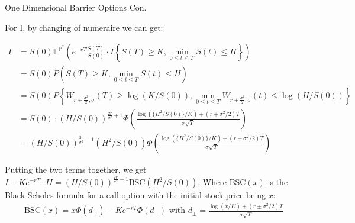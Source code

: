 \documentclass{beamer}
\begin{document}
\begin{frame}{One Dimensional Barrier Options Con.}
    
    {\footnotesize \footnotesize
    \par For I, by changing of numeraire we can get:\pause
    \vspace{-0.5em}
    {\footnotesize \scriptsize
    \begin{align*}
    I &= S(0) \mathbb{E}^{\mathbb{P}^*} \left( e^{-rT} \frac{S(T)}{S(0)} \cdot I\left\{S(T) \geq K, \min_{0 \leq t \leq T} S(t) \leq H\right\} \right) \\
    &= S(0) \tilde{P}\left(S(T) \geq K, \min_{0 \leq t \leq T} S(t) \leq H\right) \\
    &= S(0) P\left\{W_{r+\frac{\sigma^2}{2}, \sigma}(T) \geq \log(K/S(0)), \min_{0 \leq t \leq T} W_{r+\frac{\sigma^2}{2}, \sigma}(t) \leq \log(H/S(0))\right\} \\
    &= S(0) \cdot (H/S(0))^{\frac{2r}{\sigma^2}+1} \Phi \left( \frac{\log(\{H^2/S(0)\}/K)+(r+\sigma^2/2)T}{\sigma\sqrt{T}} \right) \\
    &= (H/S(0))^{\frac{2r}{\sigma^2}-1}(H^2/S(0)) \Phi \left( \frac{\log(\{H^2/S(0)\}/K)+(r+\sigma^2/2)T}{\sigma\sqrt{T}} \right)
    \end{align*}\pause
    \par Putting the two terms together, we get $I - Ke^{-rT} \cdot II = (H/S(0))^{\frac{2r}{\sigma^2}-1} \text{BSC}(H^2/S(0))$. 
    Where \(\text{BSC}(x)\) is the Black-Scholes formula for a call option with the initial stock price being \(x\):
    \begin{align*}
        \text{BSC}(x) = x\Phi(d_+) - Ke^{-rT}\Phi(d_-) \text{ with } d_{\pm} = \frac{\log(x/K)+(r\pm\sigma^2/2)T}{\sigma\sqrt{T}}
    \end{align*}
    \vspace{-1em}
    }
    }
\end{frame}
\end{document}
